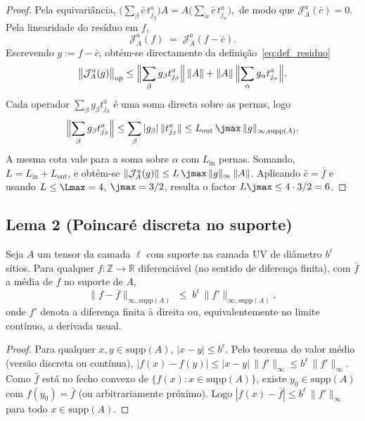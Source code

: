 \begin{proof}
Pela equivariância,
\(
  \bigl(\sum_\beta \bar c\, t^a_{j_\beta}\bigr) A
  = A \bigl(\sum_\alpha \bar c\, t^a_{j_\alpha}\bigr),
\)
de modo que $\mathcal{J}_A^a(\bar c) = 0$. Pela linearidade do
resíduo em $f$,
\[
  \mathcal{J}_A^a(f) \;=\; \mathcal{J}_A^a(f - \bar c).
\]
Escrevendo $g := f - \bar c$, obtém-se directamente da
definição~\eqref{eq:def_residuo}
\[
  \bigl\|\mathcal{J}_A^a(g)\bigr\|_{\mathrm{op}}
  \le \Bigl\|\sum_\beta g_\beta t^a_{j_\beta}\Bigr\|\,\|A\|
   + \|A\|\,\Bigl\|\sum_\alpha g_\alpha t^a_{j_\alpha}\Bigr\|.
\]
Cada operador $\sum_\beta g_\beta t^a_{j_\beta}$ é uma soma directa
sobre as pernas, logo
\[
  \Bigl\|\sum_\beta g_\beta t^a_{j_\beta}\Bigr\|
  \le \sum_\beta |g_\beta|\,\|t^a_{j_\beta}\|
  \le L_{\mathrm{out}}\,\jmax\,\|g\|_{\infty,\mathrm{supp}(A)}.
\]
A mesma cota vale para a soma sobre $\alpha$ com $L_{\mathrm{in}}$ pernas.
Somando, $L = L_{\mathrm{in}} + L_{\mathrm{out}}$, e obtém-se
$\|\mathcal{J}_A^a(g)\| \le L\,\jmax\,\|g\|_\infty\,\|A\|$. Aplicando
$\bar c = \bar f$ e usando $L \le \Lmax = 4$, $\jmax = 3/2$, resulta
o factor $L \jmax \le 4 \cdot 3/2 = 6$.
\end{proof}

\subsection{Lema 2 (Poincaré discreta no suporte)}

\begin{lemma}\label{lem:poincare}
Seja $A$ um tensor da camada $\ell$ com suporte na camada UV de
diâmetro $b^\ell$ sítios. Para qualquer $f: \mathbb{Z} \to \mathbb{R}$
diferenciável (no sentido de diferença finita), com $\bar f$ a média
de $f$ no suporte de $A$,
\begin{equation}
  \|f - \bar f\|_{\infty,\,\mathrm{supp}(A)}
  \;\le\; b^\ell\,\|f'\|_{\infty,\,\mathrm{supp}(A)},
  \label{eq:lema2}
\end{equation}
onde $f'$ denota a diferença finita à direita ou, equivalentemente
no limite contínuo, a derivada usual.
\end{lemma}

\begin{proof}
Para qualquer $x, y \in \mathrm{supp}(A)$, $|x - y| \le b^\ell$.
Pelo teorema do valor médio (versão discreta ou contínua),
\(
  |f(x) - f(y)| \le |x - y|\,\|f'\|_\infty \le b^\ell\,\|f'\|_\infty.
\)
Como $\bar f$ está no fecho convexo de $\{f(x): x \in \mathrm{supp}(A)\}$,
existe $y_0 \in \mathrm{supp}(A)$ com $f(y_0) = \bar f$ (ou
arbitrariamente próximo). Logo
\(
  |f(x) - \bar f| \le b^\ell\,\|f'\|_\infty
\)
para todo $x \in \mathrm{supp}(A)$.
\end{proof}

